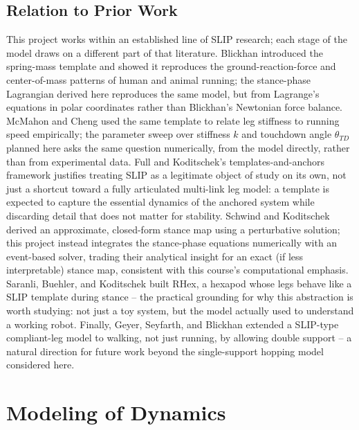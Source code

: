 \documentclass[11pt]{article}
\begin{document}
\subsection*{Relation to Prior Work}
This project works within an established line of SLIP research;
each stage of the model draws on a different part of that literature.
Blickhan \cite{blickhan1989} introduced the spring-mass template and
showed it reproduces the ground-reaction-force and center-of-mass
patterns of human and animal running; the stance-phase Lagrangian
derived here reproduces the same model, but from Lagrange's equations
in polar coordinates rather than Blickhan's Newtonian force balance.
McMahon and Cheng \cite{mcmahon1990} used the same template to relate
leg stiffness to running speed empirically; the parameter sweep over
stiffness $k$ and touchdown angle $\theta_{TD}$ planned here asks the
same question numerically, from the model directly, rather than from
experimental data. Full and Koditschek's templates-and-anchors
framework \cite{full1999} justifies treating SLIP as a legitimate
object of study on its own, not just a shortcut toward a fully
articulated multi-link leg model: a template is expected to capture
the essential dynamics of the anchored system while discarding detail
that does not matter for stability. Schwind and Koditschek
\cite{schwind2000} derived an approximate, closed-form stance map
using a perturbative solution; this project instead integrates the
stance-phase equations numerically with an event-based solver, trading
their analytical insight for an exact (if less interpretable) stance
map, consistent with this course's computational emphasis. Saranli,
Buehler, and Koditschek \cite{saranli2001} built RHex, a hexapod whose
legs behave like a SLIP template during stance -- the practical
grounding for why this abstraction is worth studying: not just a toy
system, but the model actually used to understand a working robot.
Finally, Geyer, Seyfarth, and Blickhan \cite{geyer2006} extended a
SLIP-type compliant-leg model to walking, not just running, by allowing
double support -- a natural direction for future work beyond the
single-support hopping model considered here.

\section{Modeling of Dynamics}
\end{document}
